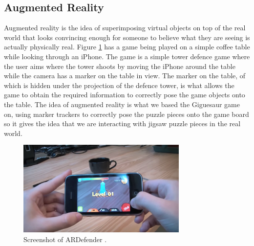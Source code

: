 \documentclass{article}
\begin{document}
\subsection{Augmented Reality} \label{ssec:AugReality}
Augmented reality is the idea of superimposing virtual objects on top of the
real world that looks convincing enough for someone to believe what they are
seeing is actually physically real. Figure \ref{fig:ARDefender} has a game being
played on a simple coffee table while looking through an iPhone. The game is a
simple tower defence game where the user aims where the tower shoots by moving
the iPhone around the table while the camera has a marker on the table in
view. The marker on the table, of which is hidden under the projection of the
defence tower, is what allows the game to obtain the required information to
correctly pose the game objects onto the table. The idea of augmented reality is
what we based the Giguesaur game on, using marker trackers to correctly pose the
puzzle pieces onto the game board so it gives the idea that we are interacting
with jigsaw puzzle pieces in the real world.

\begin{figure}[ht]
\begin{center}
\includegraphics[width=0.75\textwidth]{images/ARDefenderImage}
\caption{Screenshot of ARDefender \cite{img:ARDefender}.}
\label{fig:ARDefender}
\end{center}
\end{figure}

\end{document}
